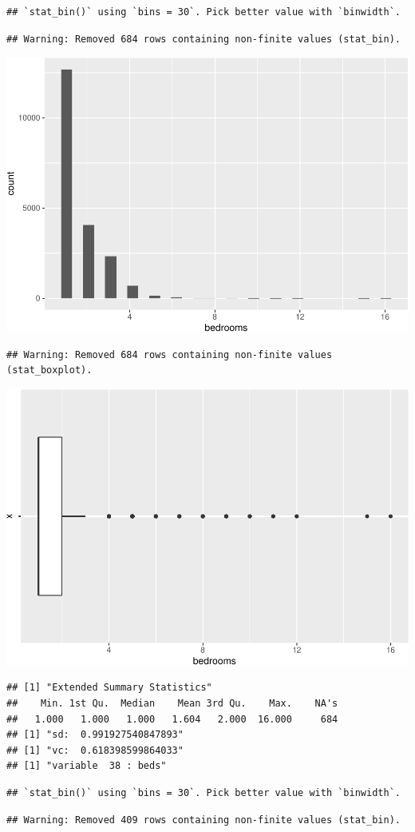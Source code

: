 \begin{verbatim}
## `stat_bin()` using `bins = 30`. Pick better value with `binwidth`.
\end{verbatim}

\begin{verbatim}
## Warning: Removed 684 rows containing non-finite values (stat_bin).
\end{verbatim}

\includegraphics[width=0.5\linewidth]{anal_files/figure-latex/figures-side-18}

\begin{verbatim}
## Warning: Removed 684 rows containing non-finite values (stat_boxplot).
\end{verbatim}

\includegraphics[width=0.5\linewidth]{anal_files/figure-latex/figures-side-19}

\begin{verbatim}
## [1] "Extended Summary Statistics"
##    Min. 1st Qu.  Median    Mean 3rd Qu.    Max.    NA's 
##   1.000   1.000   1.000   1.604   2.000  16.000     684 
## [1] "sd:  0.991927540847893"
## [1] "vc:  0.618398599864033"
## [1] "variable  38 : beds"
\end{verbatim}

\begin{verbatim}
## `stat_bin()` using `bins = 30`. Pick better value with `binwidth`.
\end{verbatim}

\begin{verbatim}
## Warning: Removed 409 rows containing non-finite values (stat_bin).
\end{verbatim}

